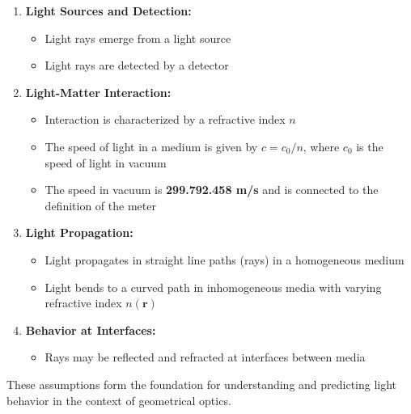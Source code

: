 \documentclass[
  a4paper,
]{book}
\providecommand{\tightlist}{%
  \setlength{\itemsep}{0pt}\setlength{\parskip}{0pt}}
\begin{document}
\begin{tcolorbox}[enhanced jigsaw, coltitle=black, title=\textcolor{quarto-callout-note-color}{\faInfo}\hspace{0.5em}{Core Assumptions}, colframe=quarto-callout-note-color-frame, toprule=.15mm, opacitybacktitle=0.6, left=2mm, opacityback=0, breakable, toptitle=1mm, bottomtitle=1mm, leftrule=.75mm, arc=.35mm, titlerule=0mm, colbacktitle=quarto-callout-note-color!10!white, rightrule=.15mm, bottomrule=.15mm, colback=white]

\begin{enumerate}
\def\labelenumi{\arabic{enumi}.}
\tightlist
\item
  \textbf{Light Sources and Detection:}

  \begin{itemize}
  \tightlist
  \item
    Light rays emerge from a light source
  \item
    Light rays are detected by a detector
  \end{itemize}
\item
  \textbf{Light-Matter Interaction:}

  \begin{itemize}
  \tightlist
  \item
    Interaction is characterized by a refractive index \(n\)
  \item
    The speed of light in a medium is given by \(c=c_0/n\), where
    \(c_0\) is the speed of light in vacuum
  \item
    The speed in vacuum is \textbf{299.792.458 m/s} and is connected to
    the definition of the meter
  \end{itemize}
\item
  \textbf{Light Propagation:}

  \begin{itemize}
  \tightlist
  \item
    Light propagates in straight line paths (rays) in a homogeneous
    medium
  \item
    Light bends to a curved path in inhomogeneous media with varying
    refractive index \(n(\textbf{r})\)
  \end{itemize}
\item
  \textbf{Behavior at Interfaces:}

  \begin{itemize}
  \tightlist
  \item
    Rays may be reflected and refracted at interfaces between media
  \end{itemize}
\end{enumerate}

These assumptions form the foundation for understanding and predicting
light behavior in the context of geometrical optics.

\end{tcolorbox}
\end{document}
